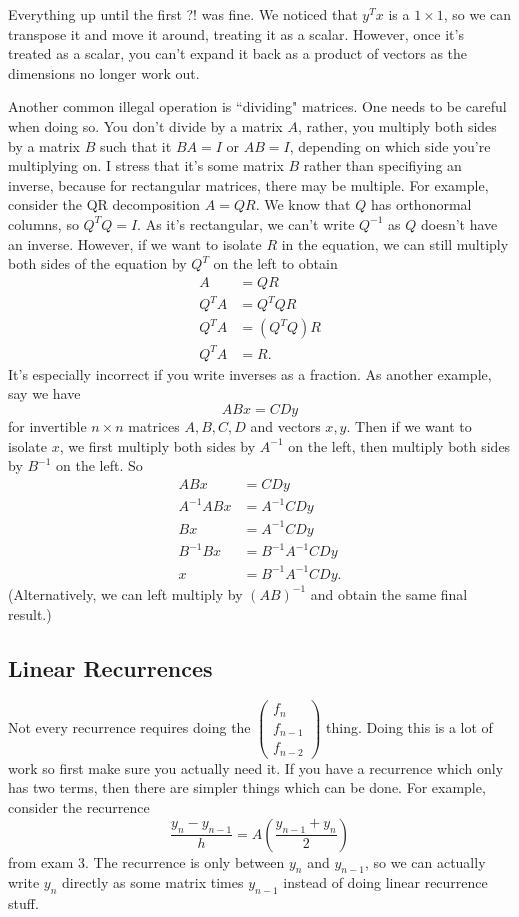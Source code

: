 \documentclass[11pt]{article}
\theoremstyle{plain} %
\theoremstyle{definition}
\theoremstyle{remark}
\begin{document}
Everything up until the first ?! was fine. We noticed that $y^Tx$ is a $1\times 1$, so we can transpose it and move it around, treating it as a scalar. However, once it's treated as a scalar, you can't expand it back as a product of vectors as the dimensions no longer work out.

Another common illegal operation is ``dividing" matrices. One needs to be careful when doing so. You don't divide by a matrix $A$, rather, you multiply both sides by a matrix $B$ such that it $BA = I$ or $AB = I$, depending on which side you're multiplying on. I stress that it's some matrix $B$ rather than specifiying an inverse, because for rectangular matrices, there may be multiple. For example, consider the QR decomposition $A = QR$. We know that $Q$ has orthonormal columns, so $Q^TQ = I$. As it's rectangular, we can't write $Q^{-1}$ as $Q$ doesn't have an inverse. However, if we want to isolate $R$ in the equation, we can still multiply both sides of the equation by $Q^T$ on the left to obtain
\begin{align*}
A &= QR\\
Q^TA &= Q^TQR\\
Q^TA &= (Q^TQ)R\\
Q^TA &= R.
\end{align*}
It's especially incorrect if you write inverses as a fraction. As another example, say we have $$ABx = CDy$$ for invertible $n \times n$ matrices $A, B, C, D$ and vectors $x, y$. Then if we want to isolate $x$, we first multiply both sides by $A^{-1}$ on the left, then multiply both sides by $B^{-1}$ on the left. So
\begin{align*}
ABx &= CDy\\
A^{-1}ABx &= A^{-1}CDy\\
Bx &= A^{-1}CDy\\
B^{-1}Bx &= B^{-1}A^{-1}CDy\\
x &= B^{-1}A^{-1}CDy.
\end{align*}
(Alternatively, we can left multiply by $(AB)^{-1}$ and obtain the same final result.)

\subsection{Linear Recurrences}
Not every recurrence requires doing the $\begin{pmatrix}f_n \\ f_{n-1} \\ f_{n-2}\end{pmatrix}$ thing. Doing this is a lot of work so first make sure you actually need it. If you have a recurrence which only has two terms, then there are simpler things which can be done. For example, consider the recurrence $$\frac{y_n-y_{n-1}}{h} = A\left(\frac{y_{n-1}+y_n}{2}\right)$$ from exam 3. The recurrence is only between $y_n$ and $y_{n-1}$, so we can actually write $y_n$ directly as some matrix times $y_{n-1}$ instead of doing linear recurrence stuff.
\end{document}
